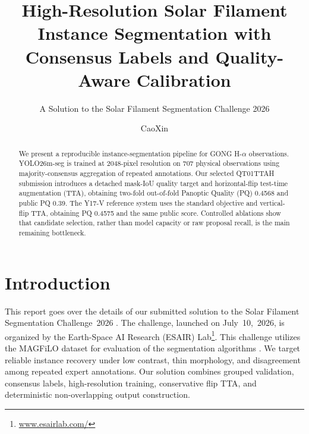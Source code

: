 \documentclass[sigconf]{acmart}
\begin{document}
\title[High-Resolution Solar Filament Segmentation]{High-Resolution Solar Filament Instance Segmentation with Consensus Labels and Quality-Aware Calibration}
\subtitle{A Solution to the Solar Filament Segmentation Challenge 2026}

\author{CaoXin}

\begin{abstract}
We present a reproducible instance-segmentation pipeline for GONG H-$\alpha$ observations.
YOLO26m-seg is trained at 2048-pixel resolution on 707 physical observations using
majority-consensus aggregation of repeated annotations. Our selected QT01TTAH submission introduces
a detached mask-IoU quality target and horizontal-flip test-time augmentation (TTA), obtaining
two-fold out-of-fold Panoptic Quality (PQ) 0.4568 and public PQ 0.39. The Y17-V reference system
uses the standard objective and vertical-flip TTA, obtaining PQ 0.4575 and the same public score.
Controlled ablations show that
candidate selection, rather than model capacity or raw proposal recall, is the main remaining
bottleneck.
\end{abstract}

\maketitle

\section{Introduction}
This report goes over the details of our submitted solution to the Solar Filament Segmentation
Challenge~2026 \cite{filament-segmentation-2026}. The challenge, launched on July~10,~2026, is
organized by the Earth-Space AI Research (ESAIR) Lab\footnote{\href{https://www.esairlab.com/home}{www.esairlab.com/}}.
This challenge utilizes the MAGFiLO dataset for evaluation of the segmentation algorithms
\cite{ahmadzadeh2024dataset}. We target reliable instance recovery under low contrast, thin
morphology, and disagreement among repeated expert annotations. Our solution combines grouped
validation, consensus labels, high-resolution training, conservative flip TTA, and deterministic
non-overlapping output construction.
\end{document}
